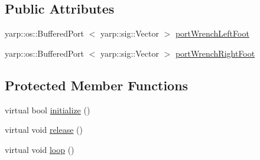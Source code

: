 \subsection*{\-Public \-Attributes}
\begin{DoxyCompactItemize}
\item 
yarp\-::os\-::\-Buffered\-Port\*
$<$ yarp\-::sig\-::\-Vector $>$ \hyperlink{classWalkingClient_a88ee63ff6a341eccd458d24700383457}{port\-Wrench\-Left\-Foot}
\item 
yarp\-::os\-::\-Buffered\-Port\*
$<$ yarp\-::sig\-::\-Vector $>$ \hyperlink{classWalkingClient_a96321dc60e84c193f2dea6e85983ca67}{port\-Wrench\-Right\-Foot}
\end{DoxyCompactItemize}
\subsection*{\-Protected \-Member \-Functions}
\begin{DoxyCompactItemize}
\item 
virtual bool \hyperlink{classWalkingClient_aba6a03fe29a4e947bc6bc0c09a713b2a}{initialize} ()
\item 
virtual void \hyperlink{classWalkingClient_a3b36da9d7649865a13c9318dd73ebc7e}{release} ()
\item 
virtual void \hyperlink{classWalkingClient_afd997bb00534c57fe1b0d5f37f207386}{loop} ()
\end{DoxyCompactItemize}
